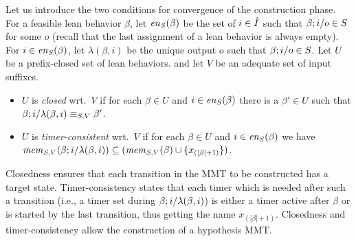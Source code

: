 Let us introduce the two conditions for convergence of the construction phase.
For a feasible lean behavior $\beta$, let $\feasibleinputs{\beta}{S}$ be the
set of $i \in \extinputs$ such that
$\beta ; \simpleutlabel{i}{o} \in S$ for some $o$ (recall that the
last assignment of a lean behavior is always empty).
For $i \in \feasibleinputs{\beta}{S}$, let $\lambda(\beta,i)$ be the unique
output $o$ such that $\beta ; \simpleutlabel{i}{o} \in S$.
Let $U$ be a prefix-closed set of lean behaviors.
and let $V$ be an adequate set of input suffixes.
\begin{itemize}
\item
$U$ is {\em closed} wrt.\ $V$ if 
  for each $\beta \in U$ and
  $i \in \feasibleinputs{\beta}{S}$
  there is a $\beta' \in U$ such that
  $\beta;\simpleutlabel{i}{\lambda(\beta,i)} \equiv_{S,V} \beta'$.
\item
$U$ is {\em timer-consistent} wrt.\ $V$ if 
  for each $\beta \in U$ and
  $i \in \feasibleinputs{\beta}{S}$
  we have
  $\apprgetmemorable{S}{\beta;\simpleutlabel{i}{\lambda(\beta,i)}}{V} \subseteq
  (\apprgetmemorable{S}{\beta}{V} \cup \set{x_{(|\beta|+1)}})$.
\end{itemize}
Closedness ensures that each transition in the MMT to be constructed has a target state. 
Timer-consistency states that each timer which is needed after such
a transition (i.e., a timer set during $\beta;\simpleutlabel{i}{\lambda(\beta,i)}$)
is either a timer active after $\beta$ or is started by the last transition, thus
getting the name $x_{(|\beta|+1)}$.
Closedness and timer-consistency allow the construction of a hypothesis MMT.

